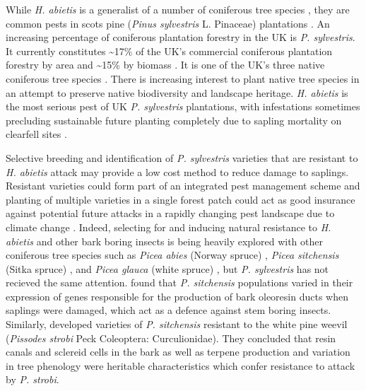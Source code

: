 \documentclass[a4paper, 11pt]{article}
\begin{document}
While \textit{H. abietis} is a generalist of a number of coniferous tree species \citep{Wallertz2014, Toivonen2006}, they are common pests in scots pine (\textit{Pinus sylvestris} L. Pinaceae) plantations \citep{Manlove1997}. An increasing percentage of coniferous plantation forestry in the UK is \textit{P. sylvestris}. It currently constitutes \textasciitilde{}17\% of the UK's commercial coniferous plantation forestry by area and \textasciitilde{}15\% by biomass \citep{ForestryStatistics2018}. It is one of the UK's three native coniferous tree species \citep{Cheffings2005}. There is increasing interest to plant native tree species in an attempt to preserve native biodiversity and landscape heritage. \textit{H. abietis} is the most serious pest of UK \textit{P. sylvestris} plantations, with infestations sometimes precluding sustainable future planting completely due to sapling mortality on clearfell sites \citep{Willoughby2017}.

Selective breeding and identification of \textit{P. sylvestris} varieties that are resistant to \textit{H. abietis} attack may provide a low cost method to reduce damage to saplings. Resistant varieties could form part of an integrated pest management scheme \citep{Telford2014} and planting of multiple varieties in a single forest patch could act as good insurance against potential future attacks in a rapidly changing pest landscape due to climate change \citep{Alfaro2014}. Indeed, selecting for and inducing natural resistance to \textit{H. abietis} and other bark boring insects is being heavily explored with other coniferous tree species such as \textit{Picea abies} (Norway spruce) \citep{Eyles2009, Schiebe2012}, \textit{Picea sitchensis} (Sitka spruce) \citep{King2011}, and \textit{Picea glauca} (white spruce) \citep{Kiss1991}, but \textit{P. sylvestris} has not recieved the same attention. \citet{Byun2006} found that \textit{P. sitchensis} populations varied in their expression of genes responsible for the production of bark oleoresin ducts when saplings were damaged, which act as a defence against stem boring insects. Similarly, \citet{Alfaro2013} developed varieties of \textit{P. sitchensis} resistant to the white pine weevil (\textit{Pissodes strobi} Peck Coleoptera: Curculionidae). They concluded that resin canals and sclereid cells in the bark as well as terpene production and variation in tree phenology were heritable characteristics which confer resistance to attack by \textit{P. strobi}.
\end{document}
